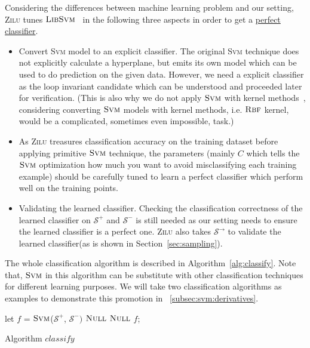 Considering the differences between machine learning problem and our setting, 
\textsc{Zilu} tunes $\textsc{LibSvm}$~\cite{chang2011libsvm} in the following three aspects in order to get a \underline{perfect classifier}.
\begin{itemize}
\item Convert \textsc{Svm} model to an explicit classifier.
The original \textsc{Svm} technique does not explicitly calculate a hyperplane, but emits its own model 
which can be used to do prediction on the given data.
However, we need a explicit classifier as the loop invariant candidate which can be understood and proceeded later for verification.
(This is also why we do not apply $\textsc{Svm}$ with kernel methods~\cite{yu2009evolving},
considering converting $\textsc{Svm}$ models with kernel methods, i.e. $\textsc{Rbf}$ kernel, would be a complicated, sometimes even impossible, task.)

\item As \textsc{Zilu} treasures classification accuracy on the training dataset%
before applying primitive $\textsc{Svm}$ technique, the parameters 
(mainly $C$ which tells the $\textsc{Svm}$ optimization how much you want to avoid misclassifying each training example)
should be carefully tuned to learn a perfect classifier which perform well on the training points.

\item Validating the learned classifier. 
Checking the classification correctness of the learned classifier 
on $\mathcal{S}^+$ and $\mathcal{S}^-$ is still needed as our setting needs to ensure the learned classifier is a perfect one.
\textsc{Zilu} also takes $\mathcal{S}^\rightarrow$ to validate the learned classifier(as is shown in Section~\ref{sec:sampling}).
\end{itemize} 

The whole classification algorithm is described in Algorithm~\ref{alg:classify}. 
Note that,
$\textsc{Svm}$ in this algorithm can be substitute with other classification techniques for different learning purposes. 
We will take two classification algorithms as examples to demonstrate this promotion in ~\ref{subsec:svm:derivatives}.
\begin{algorithm}[!h]
\SetAlgoVlined
\Indm
{}
\Indp
    let $f$ = $\textsc{Svm}$($\mathcal{S}^+$, $\mathcal{S}^-)$\;
     {
        \Return $\textsc{Null}$\;
    }
     {
        \Return $\textsc{Null}$\;
    }
    \Return $f$;
\caption{Algorithm $classify$}
\label{alg:classify}
\end{algorithm}


